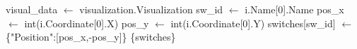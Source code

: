 \begin{algorithm}[H]
\begin{algorithmic}
                        \ENDIF
                    \ENDFOR
                \ENDIF
                \STATE visual\_data $\gets$ visualization.Visualization
                        \STATE sw\_id $\gets$ i.Name[0].Name
                            \STATE pos\_x $\gets$ int(i.Coordinate[0].X)
                            \STATE pos\_y $\gets$ int(i.Coordinate[0].Y)
                            \STATE switches[sw\_id] $\gets$ \{"Position":[pos\_x,-pos\_y]\}
                        \ENDIF 
                    \ENDFOR
                \ENDIF
            \OUTPUT \{switches\}
            \end{algorithmic}
        \end{algorithm}